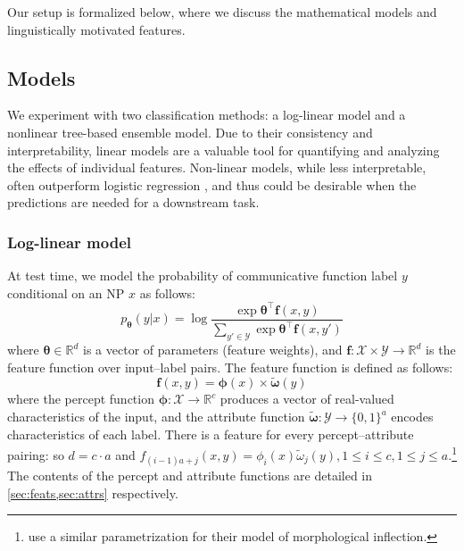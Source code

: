 \documentclass[11pt,letterpaper]{article}
\newcommand{\ensuretext}[1]{#1}
\newcommand{\cjdmarker}{\ensuretext{\textcolor{green}{\ensuremath{^{\textsc{CJ}}_{\textsc{D}}}}}}
\newcommand{\ftamarker}{\ensuretext{\textcolor{orange}{\ensuremath{^{\textsc{FT}}_{\textsc{A}}}}}}
\newcommand{\arkcomment}[3]{\ensuretext{\textcolor{#3}{[#1 #2]}}}
\newcommand{\cjd}[1]{\arkcomment{\cjdmarker}{#1}{green}}
\newcommand{\fta}[1]{\arkcomment{\ftamarker}{#1}{orange}}
\newcommand{\finalversion}[1]{}
\begin{document}
Our setup is formalized below, where we discuss the mathematical models and linguistically motivated features.

\subsection{Models}\label{sec:modelslnl}

We experiment with two classification methods: a log-linear model and a nonlinear tree-based ensemble model. 
Due to their consistency and interpretability, linear models are a valuable tool 
for quantifying and analyzing the effects of individual features. 
Non-linear models, while less interpretable, often outperform logistic regression \citep{PerlichEtAl:2003}, 
and thus could be desirable when the predictions are needed for a downstream task.

\subsubsection{Log-linear model}

At test time, we model the probability of communicative function label $y$ 
conditional on an NP $x$ as follows:
\begin{equation}
p_{\boldsymbol{\theta}}(y | x) = \log{\frac{\exp{\boldsymbol{\theta}^{\top}\mathbf{f}(x,y)}}{\sum_{y' \in \mathcal{Y}}\exp{\boldsymbol{\theta}^{\top}\mathbf{f}(x,y')}}}
\end{equation}\finalversion{\cjd{Wouldn't it make more sense, given the story about percepts and label attributes, to use the form $\boldsymbol{\phi}(x)^{T} W \boldsymbol{\omega}(y)$? Then you could cast $W$ as a linear map from the percept vector space to the attribute vector space. This is a bit different than the usual linear regression story (of course), but it's closer to what you're actually doing. I think the links to the feature vector function of $x,y$ is a bit opaque and could be a footnote, but I'll leave it up to you.}}
where $\boldsymbol{\theta} \in \mathbb{R}^d$ is a vector of parameters (feature weights), and 
$\mathbf{f}: \mathcal{X} \times \mathcal{Y} \rightarrow \mathbb{R}^d$ is the feature function over input--label pairs.
The feature function is defined as follows:
\begin{equation}
\mathbf{f}(x,y) = \boldsymbol{\phi}(x) \times \tilde{\boldsymbol{\omega}}(y)
\end{equation}
where the percept function $\boldsymbol{\phi}: \mathcal{X} \rightarrow \mathbb{R}^c$ 
produces a vector of real-valued characteristics of the input, and  
the attribute function\finalversion{\fta{define a and c to make it clear}} $\tilde{\boldsymbol{\omega}}: \mathcal{Y} \rightarrow \{0,1\}^a$
encodes characteristics of each label.
There is a feature for every percept--attribute pairing: so
$d = c \cdot a$ and $f_{(i-1)a+j}(x,y) = \phi_i(x)\tilde{\omega}_j(y), 1 \leq i \leq c, 1 \leq j \leq a$.\footnote{ 
use a similar parametrization for their model of morphological inflection.}
The contents of the percept and attribute functions are detailed in \cref{sec:feats,sec:attrs} respectively.
\end{document}
